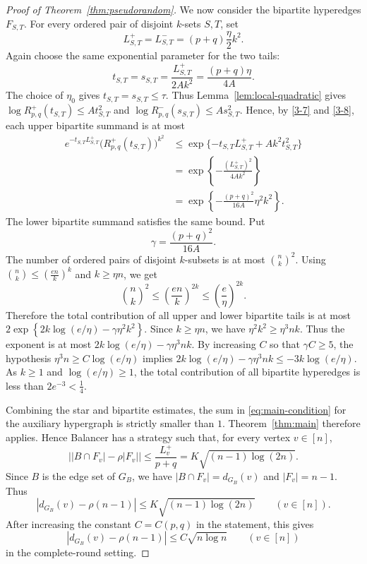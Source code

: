 \documentclass[10pt,a4paper]{amsart}
\begin{document}
\begin{proof}[Proof of Theorem~\ref{thm:pseudorandom}]
We now consider the bipartite hyperedges $F_{S,T}$.  For every ordered pair
of disjoint $k$-sets $S,T$, set
\begin{equation}\label{3-7}
L_{S,T}^+=L_{S,T}^-=(p+q)\frac{\eta}{2}k^2.
\end{equation}
Again choose the same exponential parameter for the two tails:
\begin{equation}\label{3-8}
t_{S,T}=s_{S,T}
        =
        \frac{L_{S,T}^+}{2A k^2}
        =
        \frac{(p+q)\eta}{4A}.
\end{equation}
The choice of $\eta_0$ gives
$t_{S,T}=s_{S,T}\le\tau$.
Thus Lemma~\ref{lem:local-quadratic} gives
$\log R^+_{p,q}(t_{S,T})\le A t_{S,T}^2$
and $\log R^-_{p,q}(s_{S,T})\le A s_{S,T}^2$.
Hence, by \eqref{3-7} and \eqref{3-8}, each upper bipartite summand is at most
\[
\begin{aligned}
        e^{-t_{S,T}L_{S,T}^+}
        \bigl(R^+_{p,q}(t_{S,T})\bigr)^{k^2}
        &\le
        \exp\{-t_{S,T}L_{S,T}^+ + A k^2t_{S,T}^2\}  \\
        &=
        \exp\left\{
        -\frac{(L_{S,T}^+)^2}{4Ak^2}
        \right\}  \\
        &=
        \exp\left\{
        -\frac{(p+q)^2}{16A}\eta^2k^2
        \right\}.
\end{aligned}
\]
The lower bipartite summand satisfies the same bound.  Put
\[
        \gamma=\frac{(p+q)^2}{16A}.
\]
The number of ordered pairs of disjoint $k$-subsets is at most
$\binom nk^2$.
Using
$\binom nk\le \left(\frac{en}{k}\right)^k$
and $k\ge \eta n$,
we get
\[
        \binom nk^2
        \le
        \left(\frac{en}{k}\right)^{2k}
        \le
        \left(\frac e\eta\right)^{2k}.
\]
Therefore the total contribution of all upper and lower bipartite tails is at most
$2\exp\left\{
        2k\log(e/\eta)-\gamma\eta^2k^2
        \right\}$.
Since $k\ge\eta n$, we have
$\eta^2k^2\ge \eta^3nk$.
Thus the exponent is at most
$2k\log(e/\eta)-\gamma\eta^3nk$.
By increasing $C$ so that
$\gamma C\ge5$,
the hypothesis
$ \eta^3 n\ge C\log(e/\eta)$
implies
$2k\log(e/\eta)-\gamma\eta^3nk
        \le
        -3k\log(e/\eta)$.
As $k\ge1$ and $\log(e/\eta)\ge1$, the total contribution of all bipartite
hyperedges is less than
$2e^{-3}<\frac14$.

Combining the star and bipartite estimates, the sum in \eqref{eq:main-condition}
for the auxiliary hypergraph is strictly smaller than $1$.  Theorem~\ref{thm:main}
therefore applies.  Hence Balancer has a strategy such that, for every vertex
$v\in[n]$,
\[
        \left|
        |B\cap F_v|-\rho |F_v|
        \right|
        \le
        \frac{L_v^+}{p+q}
        =
        K\sqrt{(n-1)\log(2n)}.
\]
Since $B$ is the edge set of $G_B$, we have
$|B\cap F_v|=d_{G_B}(v)$
and
$|F_v|=n-1$.
Thus
\[
        \left|
        d_{G_B}(v)-\rho(n-1)
        \right|
        \le
        K\sqrt{(n-1)\log(2n)}
        \qquad(v\in[n]).
\]
After increasing the constant $C=C(p,q)$ in the statement, this gives
\[
        \left|
        d_{G_B}(v)-\rho(n-1)
        \right|
        \le
        C\sqrt{n\log n}
        \qquad(v\in[n])
\]
in the complete-round setting.


\end{proof}
\end{document}
